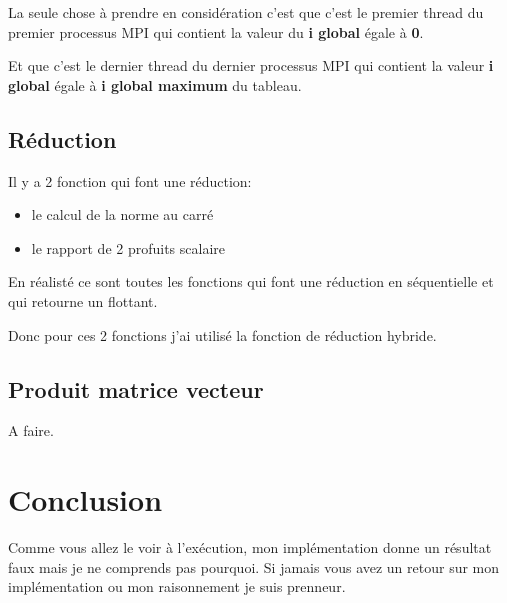 \documentclass[11pt]{article}
\begin{document}
La seule chose à prendre en considération c'est que c'est le premier thread
du premier processus MPI qui contient la valeur du \textbf{i global} égale à \textbf{0}.

Et que c'est le dernier thread du dernier processus MPI qui contient la
valeur \textbf{i global} égale à \textbf{i global maximum} du tableau.

\subsection{Réduction}
\label{sec:org52daf44}

Il y a 2 fonction qui font une réduction:
\begin{itemize}
\item le calcul de la norme au carré
\item le rapport de 2 profuits scalaire
\end{itemize}


En réalisté ce sont toutes les fonctions qui font une réduction en
séquentielle et qui retourne un flottant.

Donc pour ces 2 fonctions j'ai utilisé la fonction de réduction hybride.

\subsection{Produit matrice vecteur}
\label{sec:orgb690564}

A faire.

\section{Conclusion}
\label{sec:org50dd064}

Comme vous allez le voir à l'exécution, mon implémentation donne un résultat
faux mais je ne comprends pas pourquoi. Si jamais vous avez un retour sur mon
implémentation ou mon raisonnement je suis prenneur.
\end{document}
